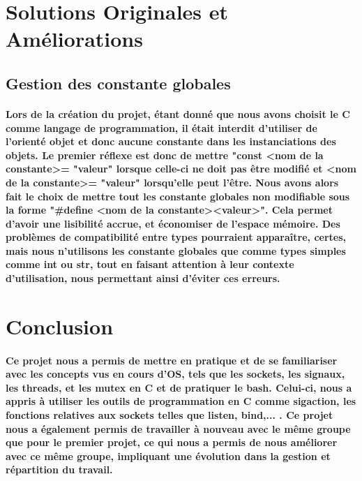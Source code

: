 \documentclass[utf8]{article}
\begin{document}
\section{Solutions Originales et Améliorations}
\subsection{Gestion des constante globales}
\paragraph{Lors de la création du projet, étant donné que nous avons choisit le C comme langage de programmation, il était interdit 
d'utiliser de l'orienté objet et donc aucune constante dans les instanciations des objets. Le premier réflexe est donc de mettre
"const \textless nom de la constante\textgreater  = "valeur" lorsque celle-ci ne doit pas être modifié et \textless nom de la constante\textgreater = "valeur" lorsqu'elle 
peut l'être. Nous avons alors fait le choix de mettre tout les constante globales non modifiable sous la forme 
"\#define \textless nom de la constante\textgreater \textless valeur\textgreater". Cela permet d'avoir une lisibilité accrue, et économiser de l'espace mémoire. Des
problèmes de compatibilité entre types pourraient apparaître, certes, mais nous n'utilisons les constante globales que comme types simples comme int ou str, tout en
faisant attention à leur contexte d'utilisation, nous permettant ainsi d'éviter ces erreurs.}

\section{Conclusion}
\paragraph{Ce projet nous a permis de mettre en pratique et de se familiariser avec les concepts vus en cours d'OS,
tels que les sockets, les signaux, les threads, et les mutex en C et de pratiquer le bash.
Celui-ci, nous a appris à utiliser les outils de programmation en C comme sigaction, les fonctions relatives aux sockets telles que listen, bind,... .
Ce projet nous a également permis de travailler à nouveau avec le même groupe que pour le premier projet, ce qui nous a permis de nous 
améliorer avec ce même groupe, impliquant une évolution dans la gestion et répartition du travail.}
\end{document}
